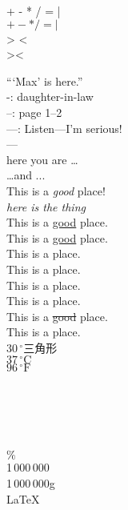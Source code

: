 \documentclass{ctexart}
\begin{document}
	
	+ - * / = | \\
	$+  - * / = |$ \\ %
	> < \\
	\textgreater \thinspace \textless
	
	``\thinspace `Max' is here.'' \\
	
	-: \thinspace daughter-in-law \\
	--: \thinspace page 1--2 \\
	---: \thinspace Listen---I'm serious! \\
	--- \\
	here you are \ldots \\
	\ldots and ... \\
	
	
	This is a \emph{good} place! \\
	
	\emph{here is \emph{the thing}} \\
	
	
	This is a \underline{good} place.\\
	
	This is a \uline{good} place.\\
	
	This is a  place.\\
	
	This is a  place.\\
	
	This is a  place.\\
	
	This is a  place.\\
	
	This is a \sout{good} place.\\
	
	This is a  place.\\
	
	
    $30\,^{\circ}$三角形 \\
    $37\,^{\circ}\mathrm{C}$ \\
    $96\,^{\circ}\mathrm{F}$ \\
    
    \texteuro \\
    \textdollar \\
    \textyen \\
    \textcopyright \\
    \textperthousand \\
    $\%$ \\
    
    1\,000\,000 \\
    \mbox1\,000\,000g \\
    
    \LaTeX \\
    
     \\
    
     \\
	
\end{document}
